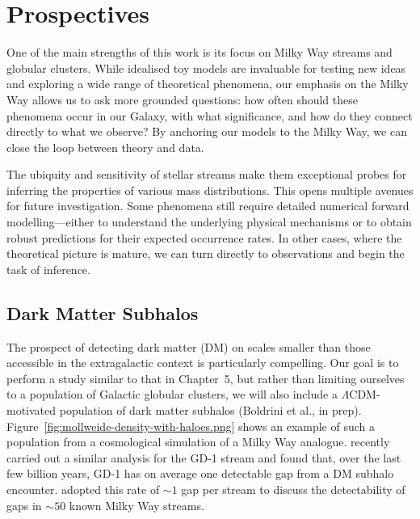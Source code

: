 \section{Prospectives}
    One of the main strengths of this work is its focus on Milky Way streams and globular clusters. While idealised toy models are invaluable for testing new ideas and exploring a wide range of theoretical phenomena, our emphasis on the Milky Way allows us to ask more grounded questions: how often should these phenomena occur in our Galaxy, with what significance, and how do they connect directly to what we observe? By anchoring our models to the Milky Way, we can close the loop between theory and data.

    The ubiquity and sensitivity of stellar streams make them exceptional probes for inferring the properties of various mass distributions. This opens multiple avenues for future investigation. Some phenomena still require detailed numerical forward modelling—either to understand the underlying physical mechanisms or to obtain robust predictions for their expected occurrence rates. In other cases, where the theoretical picture is mature, we can turn directly to observations and begin the task of inference.
    
    \subsection{Dark Matter Subhalos}
        The prospect of detecting dark matter (DM) on scales smaller than those accessible in the extragalactic context is particularly compelling. Our goal is to perform a study similar to that in Chapter~5, but rather than limiting ourselves to a population of Galactic globular clusters, we will also include a $\Lambda$CDM-motivated population of dark matter subhalos (Boldrini et al., in prep). Figure~\ref{fig:mollweide-density-with-haloes.png} shows an example of such a population from a cosmological simulation of a Milky Way analogue. \citet{2024arXiv241213144A} recently carried out a similar analysis for the GD-1 stream and found that, over the last few billion years, GD-1 has on average one detectable gap from a DM subhalo encounter. \citet{2025arXiv250207781L} adopted this rate of $\sim1$ gap per stream to discuss the detectability of gaps in $\sim 50$ known Milky Way streams.


